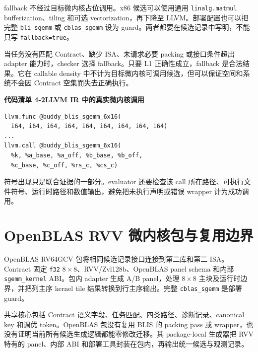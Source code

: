 fallback 不经过目标微内核占位调用。x86 候选可以使用通用 \texttt{linalg.matmul} bufferization、tiling 和可选 vectorization，再下降至 LLVM。部署配置也可以把完整 \texttt{bli\_sgemm} 或 \texttt{cblas\_sgemm} 设为 guard。两者都要在候选记录中写明，不能只写 \texttt{fallback=true}。

当任务没有匹配 Contract、缺少 ISA、未请求必要 packing 或接口条件超出 adapter 能力时，checker 选择 fallback。只要 L1 正确性成立，fallback 是合法结果。它在 callable density 中不计为目标微内核可调用候选，但可以保证空间和系统不会因 Contract 空集而失去正确执行。

\noindent\textbf{代码清单 4-2\quad LLVM IR 中的真实微内核调用}
\begin{verbatim}
llvm.func @buddy_blis_sgemm_6x16(
  i64, i64, i64, i64, i64, i64, i64, i64, i64)
...
llvm.call @buddy_blis_sgemm_6x16(
  %k, %a_base, %a_off, %b_base, %b_off,
  %c_base, %c_off, %rs_c, %cs_c)
\end{verbatim}

符号出现只是联合证据的一部分。evaluator 还要检查该 call 所在路径、可执行文件符号、运行时路径和数值输出，避免把未执行声明或错误 wrapper 计为成功调用。

\section{OpenBLAS RVV 微内核包与复用边界}

OpenBLAS RV64GCV 包将相同候选记录接口连接到第二库和第二 ISA。Contract 固定 \texttt{f32} $8\times8$、RVV/Zvl128b、OpenBLAS panel schema 和内部 \texttt{sgemm\_kernel} ABI。包内 adapter 生成 A/B panel，处理 $8\times8$ 主块及运行时边界，并把列主序 kernel tile 结果转换到行主序输出。完整 \texttt{cblas\_sgemm} 是部署 guard。

共享核心包括 Contract 语义字段、任务匹配、四类路径、诊断记录、canonical key 和调优 token。OpenBLAS 包没有复用 BLIS 的 packing pass 或 wrapper，也没有证明当前所有候选生成逻辑都能零修改迁移。其 package-local 生成器把 RVV 特有的 panel、内部 ABI 和部署工具封装在包内，再输出统一候选与观测记录。

